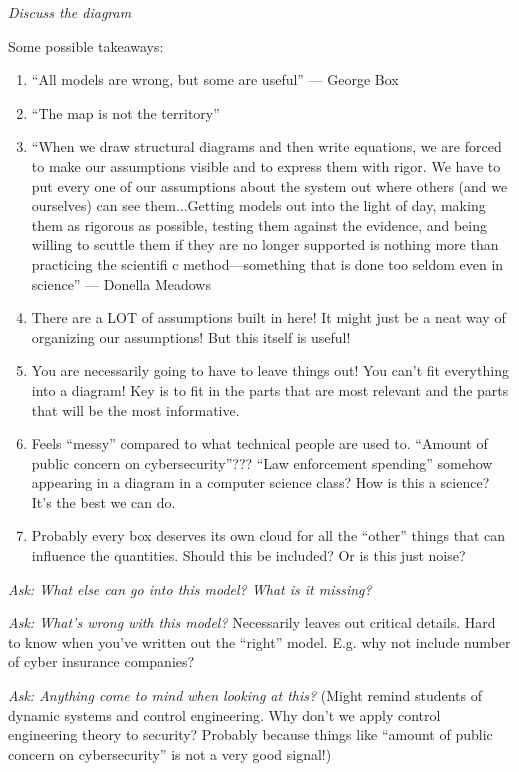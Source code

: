 \documentclass[11pt]{article}
\begin{document}
{\it Discuss the diagram}

Some possible takeaways:
\begin{enumerate}
    \item ``All models are wrong, but some are useful'' --- George Box
    \item ``The map is not the territory''
    \item ``When we draw structural diagrams and then write equations, we are forced
    to make our assumptions visible and to express them with rigor. We have
    to put every one of our assumptions about the system out where others
    (and we ourselves) can see them...Getting models out into the light of day, making them as rigorous as
    possible, testing them against the evidence, and being willing to scuttle
    them if they are no longer supported is nothing more than practicing the
    scientifi c method—something that is done too seldom even in science'' --- Donella Meadows
    \item There are a LOT of assumptions built in here! It might just be a neat way of organizing our assumptions! But this itself is useful!
    \item You are necessarily going to have to leave things out! You can't fit everything into a diagram! Key is to fit in the parts that are most relevant and the parts that will be the most informative.
    \item Feels ``messy'' compared to what technical people are used to. ``Amount of public concern on cybersecurity''??? ``Law enforcement spending'' somehow appearing in a diagram in a computer science class? How is this a science? It's the best we can do.
    \item Probably every box deserves its own cloud for all the ``other'' things that can influence the quantities. Should this be included? Or is this just noise?
\end{enumerate}

{\it Ask: What else can go into this model? What is it missing?}

{\it Ask: What's wrong with this model?} Necessarily leaves out critical details. Hard to know when you've written out the ``right'' model. E.g. why not include number of cyber insurance companies?

{\it Ask: Anything come to mind when looking at this?} (Might remind students of dynamic systems and control engineering. Why don't we apply control engineering theory to security? Probably because things like ``amount of public concern on cybersecurity'' is not a very good signal!)
\end{document}
